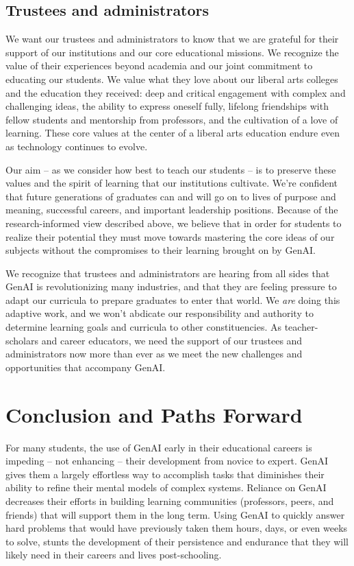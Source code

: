 \documentclass[
]{hdsr}
\begin{document}
\subsection{Trustees and
administrators}\label{trustees-and-administrators}

We want our trustees and administrators to know that we are grateful for
their support of our institutions and our core educational missions. We
recognize the value of their experiences beyond academia and our joint
commitment to educating our students. We value what they love about our
liberal arts colleges and the education they received: deep and critical
engagement with complex and challenging ideas, the ability to express
oneself fully, lifelong friendships with fellow students and mentorship
from professors, and the cultivation of a love of learning. These core
values at the center of a liberal arts education endure even as
technology continues to evolve.

Our aim -- as we consider how best to teach our students -- is to
preserve these values and the spirit of learning that our institutions
cultivate. We're confident that future generations of graduates can and
will go on to lives of purpose and meaning, successful careers, and
important leadership positions. Because of the research-informed view
described above, we believe that in order for students to realize their
potential they must move towards mastering the core ideas of our
subjects without the compromises to their learning brought on by GenAI.

We recognize that trustees and administrators are hearing from all sides
that GenAI is revolutionizing many industries, and that they are feeling
pressure to adapt our curricula to prepare graduates to enter that
world. We \emph{are} doing this adaptive work, and we won't abdicate our
responsibility and authority to determine learning goals and curricula
to other constituencies. As teacher-scholars and career educators, we
need the support of our trustees and administrators now more than ever
as we meet the new challenges and opportunities that accompany GenAI.

\section{Conclusion and Paths
Forward}\label{conclusion-and-paths-forward}

For many students, the use of GenAI early in their educational careers
is impeding -- not enhancing -- their development from novice to expert.
GenAI gives them a largely effortless way to accomplish tasks that
diminishes their ability to refine their mental models of complex
systems. Reliance on GenAI decreases their efforts in building learning
communities (professors, peers, and friends) that will support them in
the long term. Using GenAI to quickly answer hard problems that would
have previously taken them hours, days, or even weeks to solve, stunts
the development of their persistence and endurance that they will likely
need in their careers and lives post-schooling.
\end{document}
